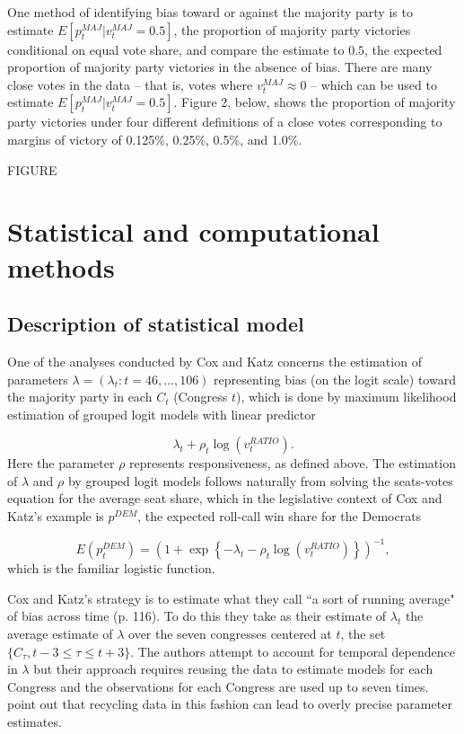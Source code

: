 One method of identifying bias toward or against the majority party is to estimate $E[p_t^{MAJ} |v_t^{MAJ}=0.5]$, the proportion of majority party victories conditional on equal vote share, and compare the estimate to $0.5$, the expected proportion of majority party victories in the absence of bias.  There are many close votes in the data -- that is, votes where $v_t^{MAJ} \approx 0$ -- which can be used to estimate $E[p_t^{MAJ} |v_t^{MAJ}=0.5]$.  Figure 2, below, shows the proportion of majority party victories under four different definitions of a close votes corresponding to margins of victory of 0.125\%, 0.25\%, 0.5\%, and 1.0\%. 

\vskip1cm
FIGURE
\vskip1cm

\section{Statistical and computational methods}
\subsection{Description of statistical model}
\label{subsection_methods}

One of the analyses conducted by Cox and Katz concerns the estimation of parameters  $\lambda = (\lambda_t : t = 46, \dots, 106)$ representing bias (on the logit scale) toward the majority party in each $C_t$ (Congress $t$), which is done by maximum likelihood estimation of grouped logit models with linear predictor

{\singlespacing
$$ \lambda_t + \rho_t \log{\left(v_t^{RATIO} \right)}. $$
}
%
Here the parameter $\rho$ represents responsiveness, as defined above. The estimation of $\lambda$ and $\rho$ by grouped logit models follows naturally from solving the seats-votes equation for the average seat share, which in the legislative context of Cox and Katz's example is $p^{DEM}$, the expected roll-call win share for the Democrats 

{\singlespacing
$$  
  E(p^{DEM}_t)  = \left(1 + \exp{\left\{- \lambda_t - \rho_t \log{\left( v_t^{RATIO}  \right)}\right\}}\right)^{-1},
$$
}
%
\noindent which is the familiar logistic function. 

Cox and Katz's strategy is to estimate what they call ``a sort of running average" of bias across time (p. 116). To do this they take as their estimate of $\lambda_t$ the average estimate of $\lambda$ over the seven congresses centered at $t$, the set $\{C_\tau, t-3 \leq \tau \leq t+3\}$. The authors attempt to account for temporal dependence in $\lambda$ but their approach requires reusing the data to estimate models for each Congress and the observations for each Congress are used up to seven times.   point out that recycling data in this fashion can lead to overly precise parameter estimates. 

